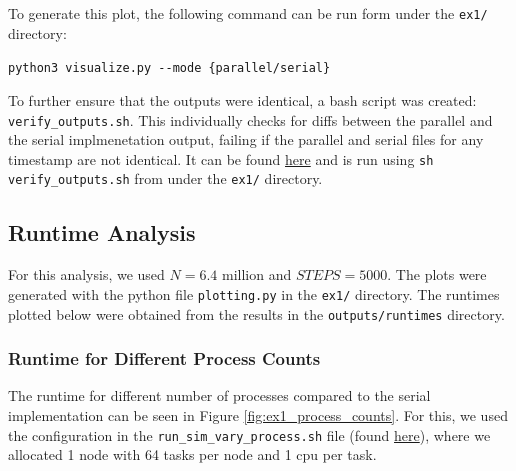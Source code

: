 \documentclass[a4paper,10pt]{article}
\begin{document}
To generate this plot, the following command can be run form under the \verb|ex1/| directory: 

\begin{center}
\verb|python3 visualize.py --mode {parallel/serial}|
\end{center}

To further ensure that the outputs were identical, a bash script was created: \verb|verify_outputs.sh|. This individually checks for diffs between the parallel and the serial implmenetation output, failing if the parallel and serial files for any timestamp are not identical. It can be found \href{https://github.com/paulmyr/DD2356-MethodsHPC/blob/master/4_mpi/ex1/verify_outputs.sh}{here} and is run using \verb|sh verify_outputs.sh| from under the \verb|ex1/| directory. 

\subsection{Runtime Analysis}
For this analysis, we used $N = 6.4\text{ million}$ and $STEPS = 5000$. The plots were generated with the python file \verb|plotting.py| in the \verb|ex1/| directory. The runtimes plotted below were obtained from the results in the \verb|outputs/runtimes| directory. 

\subsubsection{Runtime for Different Process Counts}
\label{sec:diff_process_counts}
The runtime for different number of processes compared to the serial implementation can be seen in Figure \ref{fig:ex1_process_counts}. For this, we used the configuration in the \verb|run_sim_vary_process.sh| file (found \href{https://github.com/paulmyr/DD2356-MethodsHPC/blob/master/4_mpi/ex1/run_sim_vary_process.sh}{here}), where we allocated 1 node with 64 tasks per node and 1 cpu per task.
\end{document}
